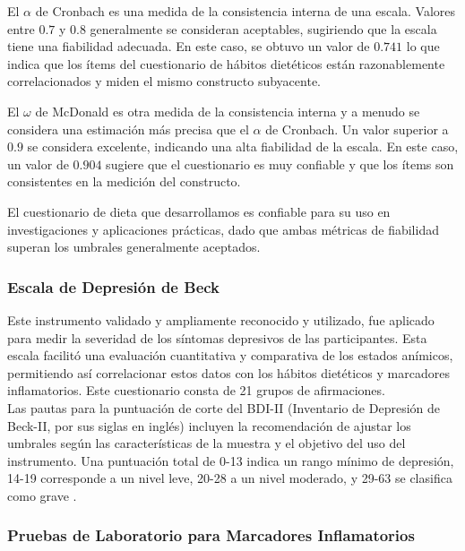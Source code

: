 \documentclass[stu, 12pt]{apa7}
\begin{document}
	El $\alpha$ de Cronbach es una medida de la consistencia interna de una escala. Valores entre $0.7$ y $0.8$ generalmente se consideran aceptables, sugiriendo que la escala tiene una fiabilidad adecuada. En este caso, se obtuvo un valor de $0.741$ lo que indica que los ítems del cuestionario de hábitos dietéticos están razonablemente correlacionados y miden el mismo constructo subyacente.

	El $\omega$ de McDonald es otra medida de la consistencia interna y a menudo se considera una estimación más precisa que el $\alpha$ de Cronbach. Un valor
	superior a $0.9$ se considera excelente, indicando una alta fiabilidad de
	la escala. En este caso, un valor de $0.904$ sugiere que el cuestionario
	es muy confiable y que los ítems son consistentes en la medición del
	constructo.

	
	El cuestionario de dieta que desarrollamos es confiable para su uso en investigaciones y aplicaciones prácticas, dado que ambas métricas de fiabilidad superan los umbrales generalmente aceptados. \\

	\subsubsection{Escala de Depresión de Beck}
	Este instrumento validado y ampliamente reconocido y utilizado, fue aplicado para medir la severidad de los síntomas depresivos de las participantes. Esta escala facilitó una evaluación cuantitativa y comparativa de los estados anímicos, permitiendo así correlacionar estos datos con los hábitos dietéticos y marcadores inflamatorios. Este cuestionario consta de 21 grupos de afirmaciones.\\

	Las pautas para la puntuación de corte del BDI-II (Inventario de Depresión de Beck-II, por sus siglas en inglés) incluyen la recomendación de ajustar los umbrales según las características de la muestra y el objetivo del uso del instrumento. Una puntuación total de 0-13 indica un rango mínimo de depresión, 14-19 corresponde a un nivel leve, 20-28 a un nivel moderado, y 29-63 se clasifica como grave \parencite{beckBeckDepressionInventory2011}.\\

	\subsubsection{Pruebas de Laboratorio para Marcadores Inflamatorios} 
	
\end{document}
